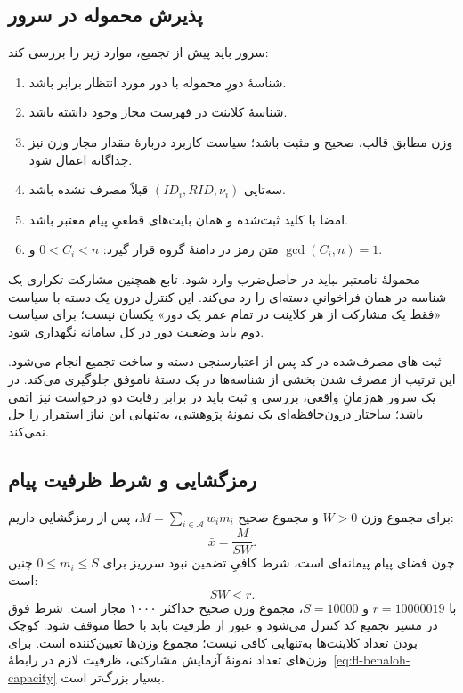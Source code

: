 \subsection{پذیرش محموله در سرور}
سرور باید پیش از تجمیع، موارد زیر را بررسی کند:
\begin{enumerate}
\item شناسۀ دورِ محموله با دور مورد انتظار برابر باشد.
\item شناسۀ کلاینت در فهرست مجاز وجود داشته باشد.
\item وزن مطابق قالب، صحیح و مثبت باشد؛ سیاست کاربرد دربارۀ مقدار مجاز وزن نیز جداگانه اعمال شود.
\item سه‌تایی $(ID_i,RID,\nu_i)$ قبلاً مصرف نشده باشد.
\item امضا با کلید ثبت‌شده و همان بایت‌های قطعیِ پیام معتبر باشد.
\item متن رمز در دامنۀ گروه قرار گیرد: $0<C_i<n$ و $\gcd(C_i,n)=1$.
\end{enumerate}
محمولۀ نامعتبر نباید در حاصل‌ضرب وارد شود. تابع  همچنین مشارکت تکراری یک شناسه در همان فراخوانیِ دسته‌ای را رد می‌کند. این کنترل درون یک دسته با سیاست «فقط یک مشارکت از هر کلاینت در تمام عمر یک دور» یکسان نیست؛ برای سیاست دوم باید وضعیت دور در کل سامانه نگهداری شود.

ثبت های مصرف‌شده در کد پس از اعتبارسنجی دسته و ساخت تجمیع انجام می‌شود. این ترتیب از مصرف شدن بخشی از شناسه‌ها در یک دستۀ ناموفق جلوگیری می‌کند. در یک سرور هم‌زمانِ واقعی، بررسی و ثبت باید در برابر رقابت دو درخواست نیز اتمی باشد؛ ساختار درون‌حافظه‌ای یک نمونۀ پژوهشی، به‌تنهایی این نیاز استقرار را حل نمی‌کند.

\subsection{رمزگشایی و شرط ظرفیت پیام}
برای مجموع وزن $W>0$ و مجموع صحیح $M=\sum_{i\in\mathcal A}w_im_i$، پس از رمزگشایی داریم:
\begin{equation}
\bar x=\frac{M}{SW}.
\label{eq:sbhe-decode}
\end{equation}
چون فضای پیام پیمانه‌ای است، شرط کافیِ تضمین نبود سرریز برای $0\le m_i\le S$ چنین است:
\begin{equation}
SW<r.
\label{eq:sbhe-capacity}
\end{equation}
با $r=10000019$ و $S=10000$، مجموع وزن صحیح حداکثر ۱۰۰۰ مجاز است. شرط فوق در مسیر تجمیع کد کنترل می‌شود و عبور از ظرفیت باید با خطا متوقف شود. کوچک بودن تعداد کلاینت‌ها به‌تنهایی کافی نیست؛ مجموع وزن‌ها تعیین‌کننده است. برای وزن‌های تعداد نمونۀ آزمایش مشارکتی، ظرفیت لازم در رابطۀ~\eqref{eq:fl-benaloh-capacity} بسیار بزرگ‌تر است.

